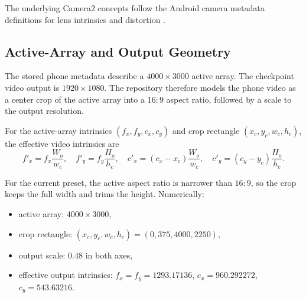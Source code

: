 \documentclass[11pt,a4paper]{article}
\begin{document}
The underlying Camera2 concepts follow the Android camera metadata definitions for lens intrinsics and distortion \citep{androidLensIntrinsics,androidLensDistortion}.

\subsection{Active-Array and Output Geometry}

The stored phone metadata describe a $4000\times3000$ active array.
The checkpoint video output is $1920\times1080$.
The repository therefore models the phone video as a center crop of the active array into a $16{:}9$ aspect ratio, followed by a scale to the output resolution.

For the active-array intrinsics $(f_x, f_y, c_x, c_y)$ and crop rectangle $(x_c, y_c, w_c, h_c)$, the effective video intrinsics are
\[
f'_x = f_x \frac{W_o}{w_c},\quad
f'_y = f_y \frac{H_o}{h_c},\quad
c'_x = (c_x - x_c)\frac{W_o}{w_c},\quad
c'_y = (c_y - y_c)\frac{H_o}{h_c}.
\]

For the current preset, the active aspect ratio is narrower than $16{:}9$, so the crop keeps the full width and trims the height.
Numerically:

\begin{itemize}
  \item active array: $4000 \times 3000$,
  \item crop rectangle: $(x_c, y_c, w_c, h_c) = (0, 375, 4000, 2250)$,
  \item output scale: $0.48$ in both axes,
  \item effective output intrinsics: $f_x=f_y=1293.17136$, $c_x=960.292272$, $c_y=543.63216$.
\end{itemize}
\end{document}
